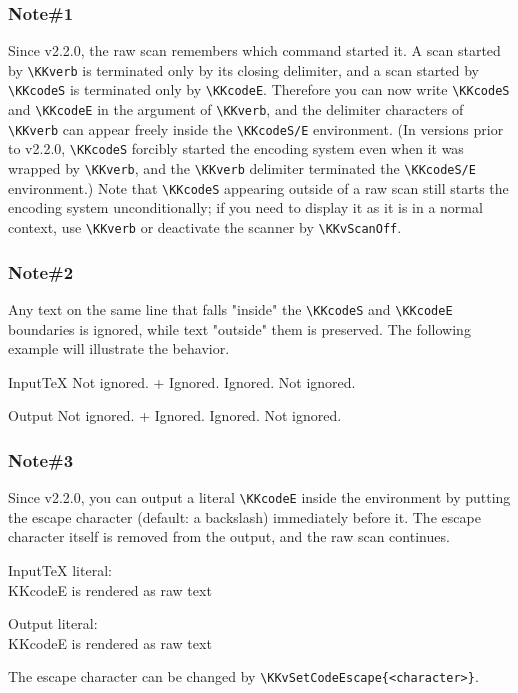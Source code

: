 \documentclass[luatex,fontsize=8pt,paper=b5,twoside]{jlreq}%
\begin{document}
\subsubsection{Note\#1}
Since v2.2.0, the raw scan remembers which command started it. A scan started by \verb|\KKverb| is terminated only by its closing delimiter, and a scan started by \verb|\KKcodeS| is terminated only by \verb|\KKcodeE|. Therefore you can now write \verb|\KKcodeS| and \verb|\KKcodeE| in the argument of \verb|\KKverb|, and the delimiter characters of \verb|\KKverb| can appear freely inside the \verb|\KKcodeS/E| environment.
(In versions prior to v2.2.0, \verb|\KKcodeS| forcibly started the encoding system even when it was wrapped by \verb|\KKverb|, and the \verb|\KKverb| delimiter terminated the \verb|\KKcodeS/E| environment.)
Note that \verb|\KKcodeS| appearing outside of a raw scan still starts the encoding system unconditionally; if you need to display it as it is in a normal context, use \verb|\KKverb| or deactivate the scanner by \verb|\KKvScanOff|.

\subsubsection{Note\#2}
Any text on the same line that falls "inside" the \verb|\KKcodeS| and \verb|\KKcodeE| boundaries is ignored, while text "outside" them is preserved. The following example will illustrate the behavior.

\begin{SourceCode}{Input}{TeX}
  Not ignored. \KKcodeS+ Ignored.
  Ignored. \KKcodeE Not ignored.
\end{SourceCode}
\KKvScanOn
\begin{OutPut}{Output}
Not ignored. \KKcodeS+ Ignored.
Ignored. \KKcodeE Not ignored.
\end{OutPut}

\KKvScanOff
\subsubsection{Note\#3}
Since v2.2.0, you can output a literal \verb|\KKcodeE| inside the environment by putting the escape character (default: a backslash) immediately before it. The escape character itself is removed from the output, and the raw scan continues.

\begin{SourceCode}{Input}{TeX}
  \KKcodeS
  literal: \\KKcodeE is rendered as raw text
  \KKcodeE
\end{SourceCode}
\KKvScanOn
\begin{OutPut}{Output}
\KKcodeS
literal: \\KKcodeE is rendered as raw text
\KKcodeE
\end{OutPut}
\KKvScanOff
The escape character can be changed by \verb|\KKvSetCodeEscape{<character>}|.
\KKvScanOn
\end{document}
